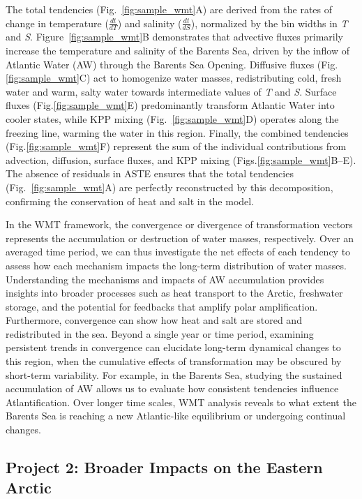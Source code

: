 \documentclass[draft]{agujournal2019}
\begin{document}
The total tendencies (Fig.~\ref{fig:sample_wmt}A) are derived from the rates of change in temperature ($\frac{dt}{dT}$) and salinity ($\frac{dt}{dS}$), normalized by the bin widths in \emph{T} and \emph{S}. Figure~\ref{fig:sample_wmt}B demonstrates that advective fluxes primarily increase the temperature and salinity of the Barents Sea, driven by the inflow of Atlantic Water (AW) through the Barents Sea Opening. Diffusive fluxes (Fig.\ref{fig:sample_wmt}C) act to homogenize water masses, redistributing cold, fresh water and warm, salty water towards intermediate values of \emph{T} and \emph{S}. Surface fluxes (Fig.\ref{fig:sample_wmt}E) predominantly transform Atlantic Water into cooler states, while KPP mixing (Fig.~\ref{fig:sample_wmt}D) operates along the freezing line, warming the water in this region. Finally, the combined tendencies (Fig.\ref{fig:sample_wmt}F) represent the sum of the individual contributions from advection, diffusion, surface fluxes, and KPP mixing (Figs.\ref{fig:sample_wmt}B--E). The absence of residuals in ASTE ensures that the total tendencies (Fig.~\ref{fig:sample_wmt}A) are perfectly reconstructed by this decomposition, confirming the conservation of heat and salt in the model.

In the WMT framework, the convergence or divergence of transformation vectors represents the accumulation or destruction of water masses, respectively. Over an averaged time period, we can thus investigate the net effects of each tendency to assess how each mechanism impacts the long-term distribution of water masses. Understanding the mechanisms and impacts of AW accumulation provides insights into broader processes such as heat transport to the Arctic, freshwater storage, and the potential for feedbacks that amplify polar amplification.  Furthermore, convergence can show how heat and salt are stored and redistributed in the sea. Beyond a single year or time period, examining persistent trends in convergence can elucidate long-term dynamical changes to this region, when the cumulative effects of transformation may be obscured by short-term variability. For example, in the Barents Sea, studying the sustained accumulation of AW allows us to evaluate how consistent tendencies influence Atlantification. Over longer time scales, WMT analysis reveals to what extent the Barents Sea is reaching a new Atlantic-like equilibrium or undergoing continual changes.

\subsection{Project 2: Broader Impacts on the Eastern Arctic}
\end{document}
